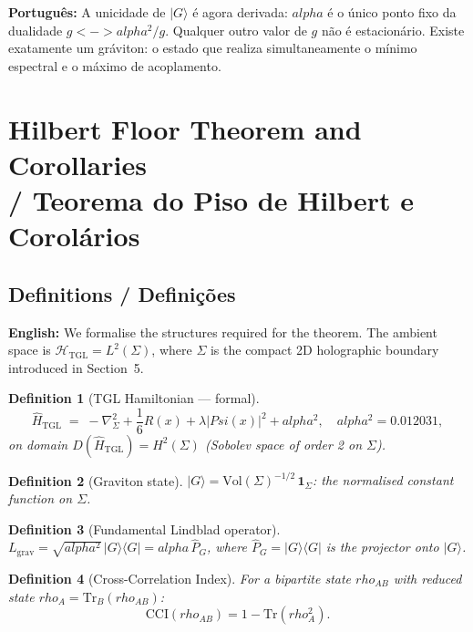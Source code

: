 \documentclass[12pt,a4paper]{article}
\newtheorem{definition}{Definition}
\def\Psi{Psi}%
\def\leftrightarrow{ <-> }%
\def\alpha{alpha}%
\def\rho{rho}%
\begin{document}
\textbf{Português:} A unicidade de $|G\rangle$ é agora derivada: $\alpha$ é o único ponto fixo da dualidade $g \leftrightarrow \alpha^2/g$. Qualquer outro valor de $g$ não é estacionário. Existe exatamente um gráviton: o estado que realiza simultaneamente o mínimo espectral e o máximo de acoplamento.

\section{Hilbert Floor Theorem and Corollaries \\/ Teorema do Piso de Hilbert e Corolários}
\label{sec:floor}

\subsection{Definitions / Definições}

\textbf{English:} We formalise the structures required for the theorem. The ambient space is $\mathcal{H}_{\text{TGL}} = L^2(\Sigma)$, where $\Sigma$ is the compact 2D holographic boundary introduced in Section~5.

\begin{definition}[TGL Hamiltonian --- formal]
\begin{equation}
\hat{H}_{\text{TGL}} \;=\; -\nabla_\Sigma^2 + \frac{1}{6}R(x) + \lambda|\Psi(x)|^2 + \alpha^2,
\quad \alpha^2 = 0.012031,
\end{equation}
on domain $D(\hat{H}_{\text{TGL}}) = H^2(\Sigma)$ (Sobolev space of order 2 on $\Sigma$).
\end{definition}

\begin{definition}[Graviton state]
$|G\rangle = \mathrm{Vol}(\Sigma)^{-1/2}\,\mathbf{1}_\Sigma$: the normalised constant function on $\Sigma$.
\end{definition}

\begin{definition}[Fundamental Lindblad operator]
$L_{\mathrm{grav}} = \sqrt{\alpha^2}\,|G\rangle\langle G| = \alpha\,\hat{P}_G$,
where $\hat{P}_G = |G\rangle\langle G|$ is the projector onto $|G\rangle$.
\end{definition}

\begin{definition}[Cross-Correlation Index]
For a bipartite state $\rho_{AB}$ with reduced state $\rho_A = \mathrm{Tr}_B(\rho_{AB})$:
\begin{equation}
\mathrm{CCI}(\rho_{AB}) = 1 - \mathrm{Tr}(\rho_A^2).
\end{equation}
\end{definition}
\end{document}
